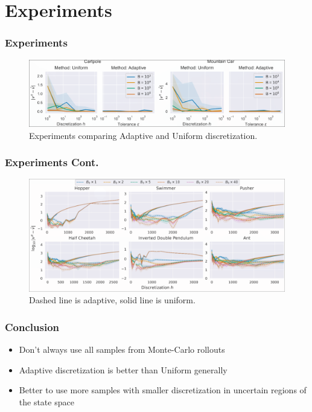 \documentclass{beamer}
\begin{document}
\section*{Experiments}
\begin{frame}
	\frametitle{Experiments}
  \begin{figure}[ht]
    \centering
    \includegraphics[width=\textwidth]{./imgs/experiments.png} %
    \caption{Experiments comparing Adaptive and Uniform discretization.}
  \end{figure}
\end{frame}

\begin{frame}
	\frametitle{Experiments Cont.}
  \begin{figure}[ht]
    \centering
    \includegraphics[width=\textwidth]{./imgs/experiments-mujoco.png} %
    \caption{Dashed line is adaptive, solid line is uniform.}
  \end{figure}
\end{frame}

\begin{frame}
	\frametitle{Conclusion}
  \begin{itemize}
    \item Don't always use all samples from Monte-Carlo rollouts
    \item Adaptive discretization is better than Uniform generally
    \item Better to use more samples with smaller discretization in uncertain regions of the state space
  \end{itemize}
\end{frame}
\end{document}

